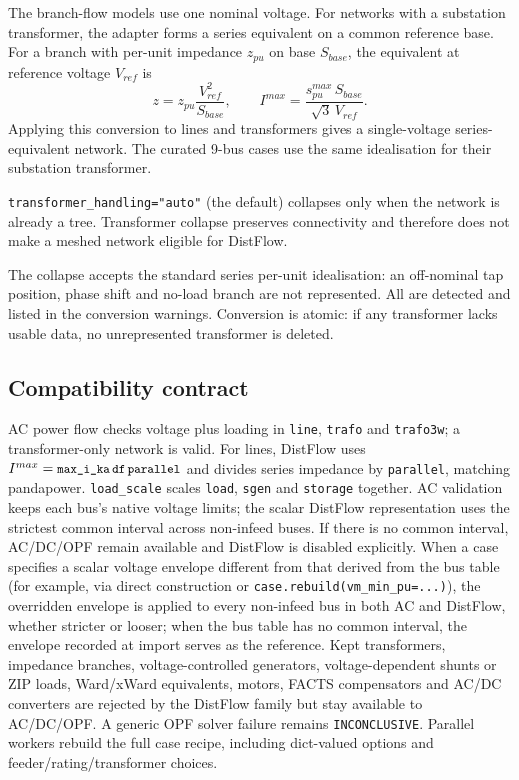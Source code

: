 \documentclass[11pt,a4paper]{report}
\newcommand{\trap}[1]{\begin{warnbox}#1\end{warnbox}}
\newcommand{\code}[1]{\texttt{\small #1}}
\begin{document}
The branch-flow models use one nominal voltage. For networks with a substation
transformer, the adapter forms a series equivalent on a common reference base.
For a branch with per-unit impedance $z_{pu}$ on base $S_{base}$, the
equivalent at reference voltage $V_{ref}$ is
\[
  z = z_{pu} \frac{V_{ref}^2}{S_{base}}, \qquad
  I^{max} = \frac{s^{max}_{pu} \, S_{base}}{\sqrt{3} \, V_{ref}} .
\]
Applying this conversion to lines and transformers gives a single-voltage
series-equivalent network. The curated 9-bus cases use the same
idealisation for their substation transformer.

\code{transformer\_handling="auto"} (the default) collapses only when the network
is already a tree. Transformer collapse preserves connectivity and therefore
does not make a meshed network eligible for DistFlow.

\trap{The collapse accepts the standard series per-unit idealisation: an
off-nominal tap position, phase shift and no-load branch are not represented.
All are detected and listed in the conversion warnings. Conversion is atomic:
if any transformer lacks usable data, no unrepresented transformer is deleted.}

\subsection{Compatibility contract}

AC power flow checks voltage plus loading in \code{line}, \code{trafo} and
\code{trafo3w}; a transformer-only network is valid. For lines, DistFlow uses
$I^{max}=\code{max\_i\_ka}\,\code{df}\,\code{parallel}$ and divides series
impedance by \code{parallel}, matching pandapower. \code{load\_scale} scales
\code{load}, \code{sgen} and \code{storage} together. AC validation keeps each
bus's native voltage limits; the scalar DistFlow representation uses the
strictest common interval across non-infeed buses. If there is no common interval, AC/DC/OPF remain
available and DistFlow is disabled explicitly. When a case specifies a scalar
voltage envelope different from that derived from the bus table (for example,
via direct construction or \code{case.rebuild(vm\_min\_pu=...)}), the
overridden envelope is applied to every non-infeed bus in both AC and DistFlow,
whether stricter or looser; when the bus table has no common interval, the
envelope recorded at import serves as the reference. Kept transformers,
impedance branches, voltage-controlled generators, voltage-dependent shunts or ZIP loads,
Ward/xWard equivalents, motors, FACTS compensators and AC/DC converters are
rejected by the DistFlow family but stay
available to AC/DC/OPF. A generic OPF solver failure remains
\code{INCONCLUSIVE}. Parallel workers rebuild the full case
recipe, including dict-valued options and feeder/rating/transformer choices.
\end{document}
